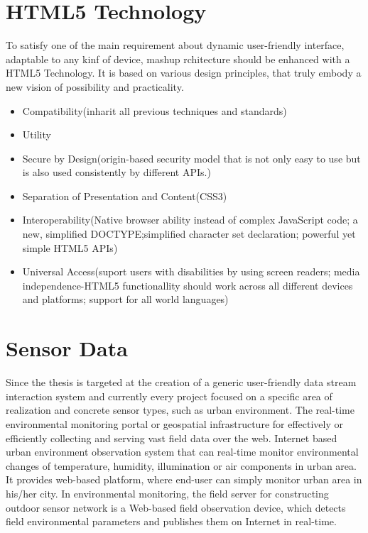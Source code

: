 \section{HTML5 Technology}
To satisfy one of the main requirement about dynamic user-friendly interface, adaptable to any kinf of device, mashup rchitecture should be enhanced with a HTML5 Technology. It is based on various design principles, that truly embody a new vision of possibility and practicality\cite{hickson2011html5}.
\begin{itemize}
\item Compatibility(inharit all previous techniques and standards)
\item Utility
\item Secure by Design(origin-based security model that is not only easy to use but is also used consistently by different APIs.)
\item Separation of Presentation and Content(CSS3)
\item Interoperability(Native browser ability instead of complex JavaScript code; a new, simplified DOCTYPE;simplified character set declaration; powerful yet simple HTML5 APIs)
\item Universal Access(suport users with disabilities by using screen readers; media independence-HTML5 functionallity should work across all different devices and platforms; support for all world languages)
\end{itemize}

\section{Sensor Data}
 Since the thesis is targeted at the creation of a generic user-friendly data stream interaction system and currently every project focused on a specific area of realization and concrete sensor types, such as urban environment\cite{song2010real}. The real-time environmental monitoring portal or geospatial infrastructure for effectively or  efficiently collecting and serving vast field data over the web. Internet based urban environment observation system that can real-time monitor environmental changes of temperature, humidity, illumination or air components in urban area. It provides web-based platform, where end-user can simply monitor urban area in his/her city. In environmental monitoring, the field server for constructing outdoor sensor network is a Web-based field observation device, which detects field environmental parameters and publishes them on Internet in real-time.

